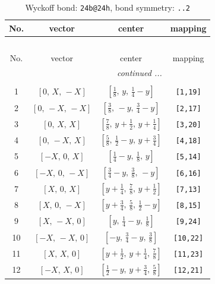 \documentclass[fleqn,8pt]{jsarticle}
\begin{document}
\renewcommand{\arraystretch}{1.2}
\begin{longtable}{cccc}
\caption{Wyckoff bond: {\tt 24b@24h}, bond symmetry: {\tt ..2}}
 \\
 \hline \hline
No. & vector & center & mapping \\ \hline \endfirsthead

\multicolumn{3}{l}{\tablename\ \thetable{}} \\
 \hline \hline
No. & vector & center & mapping \\ \hline \endhead

 \hline \hline
\multicolumn{3}{r}{\footnotesize\it continued ...} \\ \endfoot

 \hline \hline
\multicolumn{3}{r}{} \\ \endlastfoot

1 & $\left[ 0,\, X,\, - X \right]$ & $\left[ \frac{1}{8},\, y,\, \frac{1}{4} - y \right]$ & {\tt [1,19]} \\ \hline
2 & $\left[ 0,\, - X,\, - X \right]$ & $\left[ \frac{3}{8},\, - y,\, \frac{3}{4} - y \right]$ & {\tt [2,17]} \\ \hline
3 & $\left[ 0,\, X,\, X \right]$ & $\left[ \frac{7}{8},\, y + \frac{1}{2},\, y + \frac{1}{4} \right]$ & {\tt [3,20]} \\ \hline
4 & $\left[ 0,\, - X,\, X \right]$ & $\left[ \frac{5}{8},\, \frac{1}{2} - y,\, y + \frac{3}{4} \right]$ & {\tt [4,18]} \\ \hline
5 & $\left[ - X,\, 0,\, X \right]$ & $\left[ \frac{1}{4} - y,\, \frac{1}{8},\, y \right]$ & {\tt [5,14]} \\ \hline
6 & $\left[ - X,\, 0,\, - X \right]$ & $\left[ \frac{3}{4} - y,\, \frac{3}{8},\, - y \right]$ & {\tt [6,16]} \\ \hline
7 & $\left[ X,\, 0,\, X \right]$ & $\left[ y + \frac{1}{4},\, \frac{7}{8},\, y + \frac{1}{2} \right]$ & {\tt [7,13]} \\ \hline
8 & $\left[ X,\, 0,\, - X \right]$ & $\left[ y + \frac{3}{4},\, \frac{5}{8},\, \frac{1}{2} - y \right]$ & {\tt [8,15]} \\ \hline
9 & $\left[ X,\, - X,\, 0 \right]$ & $\left[ y,\, \frac{1}{4} - y,\, \frac{1}{8} \right]$ & {\tt [9,24]} \\ \hline
10 & $\left[ - X,\, - X,\, 0 \right]$ & $\left[ - y,\, \frac{3}{4} - y,\, \frac{3}{8} \right]$ & {\tt [10,22]} \\ \hline
11 & $\left[ X,\, X,\, 0 \right]$ & $\left[ y + \frac{1}{2},\, y + \frac{1}{4},\, \frac{7}{8} \right]$ & {\tt [11,23]} \\ \hline
12 & $\left[ - X,\, X,\, 0 \right]$ & $\left[ \frac{1}{2} - y,\, y + \frac{3}{4},\, \frac{5}{8} \right]$ & {\tt [12,21]} \\
\end{longtable}
\end{document}
